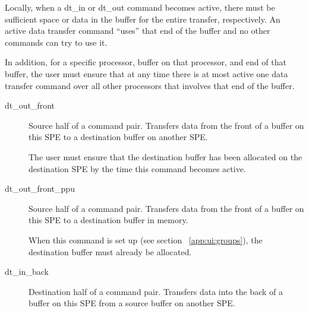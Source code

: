 Locally, when a \textsf{dt\_in} or \textsf{dt\_out} command becomes active, there must be sufficient space or data in the buffer for the entire transfer, respectively. An active data transfer command ``uses'' that end of the buffer and no other commands can try to use it.

In addition, for a specific processor, buffer on that processor, and end of that buffer, the user must ensure that at any time there is at most active one data transfer command over all other processors that involves that end of the buffer.

\begin{description}
\item[\textsf{dt\_out\_front}] Source half of a command pair. Transfers data from the front of a buffer on this SPE to a destination buffer on another SPE.

The user must ensure that the destination buffer has been allocated on the destination SPE by the time this command becomes active.

\item[\textsf{dt\_out\_front\_ppu}] Source half of a command pair. Transfers data from the front of a buffer on this SPE to a destination buffer in memory.

When this command is set up (see section ~\ref{app:ui:groups}), the destination buffer must already be allocated.

\item[\textsf{dt\_in\_back}] Destination half of a command pair. Transfers data into the back of a buffer on this SPE from a source buffer on another SPE.


\end{description}
